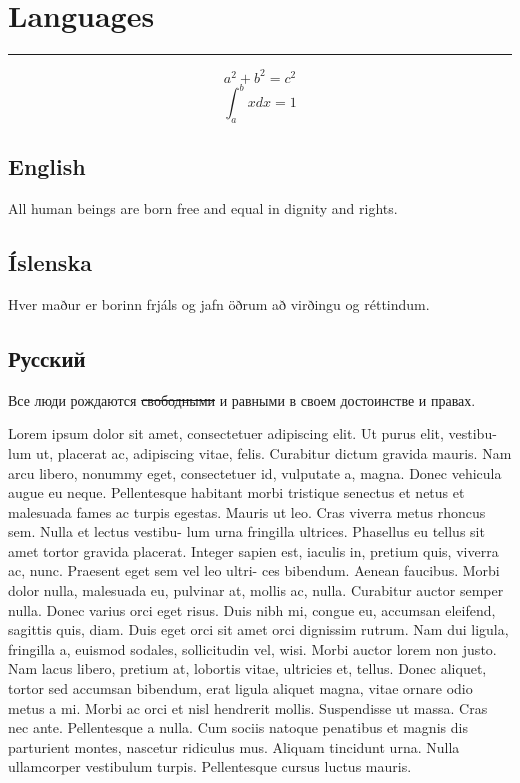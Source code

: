 \documentclass[11pt]{article}
\begin{document}
\color{magenta}

\section{Languages}
\color[rgb]{1,0,1}\rule{6cm}{1pt}\color{magenta}

\[a^2 + b^2 = c^2\]
\[\int_a^b x dx = 1\]

\subsection{English}
All human beings are born free and equal in dignity and rights.

\subsection{Íslenska}
Hver maður er borinn frjáls og jafn öðrum að virðingu og réttindum.

\subsection{Русский}
Все люди рождаются \sout{свободными} и равными в своем достоинстве и
правах.

Lorem ipsum dolor sit amet, consectetuer adipiscing elit. Ut purus elit, vestibu- lum ut, placerat ac, adipiscing vitae, felis. Curabitur dictum gravida mauris. Nam arcu libero, nonummy eget, consectetuer id, vulputate a, magna. Donec vehicula augue eu neque. Pellentesque habitant morbi tristique senectus et netus et malesuada fames ac turpis egestas. Mauris ut leo. Cras viverra metus rhoncus sem. Nulla et lectus vestibu- lum urna fringilla ultrices. Phasellus eu tellus sit amet tortor gravida placerat. Integer sapien est, iaculis in, pretium quis, viverra ac, nunc. Praesent eget sem vel leo ultri- ces bibendum. Aenean faucibus. Morbi dolor nulla, malesuada eu, pulvinar at, mollis ac, nulla. Curabitur auctor semper nulla. Donec varius orci eget risus. Duis nibh mi, congue eu, accumsan eleifend, sagittis quis, diam. Duis eget orci sit amet orci dignissim rutrum.
Nam dui ligula, fringilla a, euismod sodales, sollicitudin vel, wisi. Morbi auctor lorem non justo. Nam lacus libero, pretium at, lobortis vitae, ultricies et, tellus. Donec aliquet, tortor sed accumsan bibendum, erat ligula aliquet magna, vitae ornare odio metus a mi. Morbi ac orci et nisl hendrerit mollis. Suspendisse ut massa. Cras nec ante. Pellentesque a nulla. Cum sociis natoque penatibus et magnis dis parturient montes, nascetur ridiculus mus. Aliquam tincidunt urna. Nulla ullamcorper vestibulum turpis. Pellentesque cursus luctus mauris.
\end{document}
